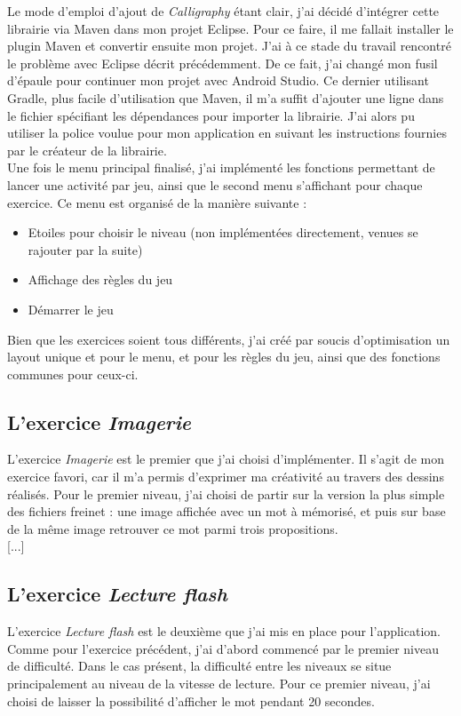 Le mode d'emploi d'ajout de \textit{Calligraphy} étant clair, j'ai décidé d'intégrer cette librairie via Maven dans mon projet Eclipse. Pour ce faire, il me fallait installer le plugin Maven et convertir ensuite mon projet. J'ai à ce stade du travail rencontré le problème avec Eclipse décrit précédemment. De ce fait, j'ai changé mon fusil d'épaule pour continuer mon projet avec Android Studio. Ce dernier utilisant Gradle, plus facile d'utilisation que Maven, il m'a suffit d'ajouter une ligne dans le fichier spécifiant les dépendances pour importer la librairie. J'ai alors pu utiliser la police voulue pour mon application en suivant les instructions fournies par le créateur de la librairie.\\

Une fois le menu principal finalisé, j'ai implémenté les fonctions permettant de lancer une activité par jeu, ainsi que le second menu s'affichant pour chaque exercice. Ce menu est organisé de la manière suivante :
\begin{itemize}
\item Etoiles pour choisir le niveau (non implémentées directement, venues se rajouter par la suite)
\item Affichage des règles du jeu
\item Démarrer le jeu
\end{itemize}
Bien que les exercices soient tous différents, j'ai créé par soucis d'optimisation un layout unique et pour le menu, et pour les règles du jeu, ainsi que des fonctions communes pour ceux-ci.


\subsection{L'exercice \textit{Imagerie}}
L'exercice \textit{Imagerie} est le premier que j'ai choisi d'implémenter. Il s'agit de mon exercice favori, car il m'a permis d'exprimer ma créativité au travers des dessins réalisés. Pour le premier niveau, j'ai choisi de partir sur la version la plus simple des fichiers freinet : une image affichée avec un mot à mémorisé, et puis sur base de la même image retrouver ce mot parmi trois propositions.\\

[...]



\subsection{L'exercice \textit{Lecture flash}}
L'exercice \textit{Lecture flash} est le deuxième que j'ai mis en place pour l'application. Comme pour l'exercice précédent, j'ai d'abord commencé par le premier niveau de difficulté. Dans le cas présent, la difficulté entre les niveaux se situe principalement au niveau de la vitesse de lecture. Pour ce premier niveau, j'ai choisi de laisser la possibilité d'afficher le mot pendant 20 secondes.\\

